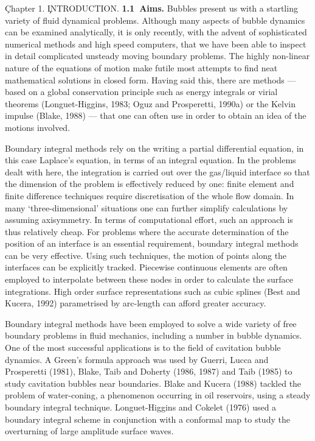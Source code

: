 \vbox{
\c{\bigrmb Chapter 1.}
\vskip 1cm
\c{\bigrmb INTRODUCTION.}
\vskip 15pt
\hbox{\bf 1.1 Aims.}
\vskip 15pt
}
Bubbles present us with a startling variety of
fluid dynamical problems. Although many aspects of
bubble dynamics can be examined analytically, it is only
recently, with the advent of sophisticated numerical methods
and high speed computers, that we have been able to inspect in
detail complicated unsteady moving boundary problems. 
The highly non-linear
nature of the equations of motion make futile most attempts to find
neat
mathematical solutions in closed form. Having said this, there are
methods --- based on a global conservation 
principle such as energy integrals or virial theorems 
(Longuet-Higgins, 1983; Oguz and Prosperetti, 1990a)
or the Kelvin impulse (Blake, 1988) ---
that one can often use in order to obtain an idea of the
motions involved. 

Boundary integral methods rely on the
writing a partial differential equation, in this case
Laplace's equation, in terms of an integral equation. 
In the problems dealt with here, the
integration is carried out over the gas/liquid interface so that
the dimension of the problem is effectively reduced by one:
finite element and finite difference techniques
require discretisation of the whole flow domain. In many 
`three-dimensional' situations one can further simplify calculations
by assuming axisymmetry. 
In terms of computational effort, such an 
approach is thus relatively cheap.
For problems where the accurate determination of the
position of an interface is an
essential requirement,
boundary integral methods can be very effective.
Using such techniques, the motion of points
along the interfaces can be explicitly
tracked. Piecewise continuous elements are often employed
to interpolate between these nodes in order to calculate
the surface integrations. High order surface representations
such as cubic splines (Best and Kucera, 1992) parametrised by arc-length
can afford greater accuracy.

Boundary integral methods have been employed to solve a wide variety
of free boundary problems in fluid mechanics, including a number in
bubble dynamics.
One of the most successful applications is to the field of
cavitation bubble dynamics.
A Green's formula approach was used 
by Guerri, Lucca and Prosperetti (1981),
Blake, Taib and Doherty
(1986, 1987) and Taib (1985) to study cavitation bubbles
near boundaries.  
Blake and Kucera (1988) tackled
the problem of water-coning, a phenomenon occurring in oil reservoirs,
using a steady boundary integral technique. Longuet-Higgins
and Cokelet (1976) used a boundary integral scheme in conjunction
with a conformal map to study the 
overturning of large amplitude surface waves.

